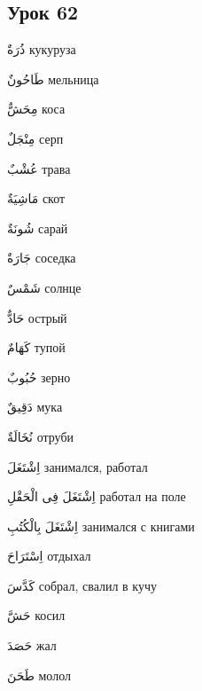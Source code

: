 \documentclass[a5paper]{article}
\newcommand\textstyleDropCaps[1]{#1}
\newcommand\textstyleCaptioncharacters[1]{#1}
\begin{document}
\subsection[Урок 62‎]{\textstyleDropCaps{Урок 62‎}}
\textstyleCaptioncharacters{ذُرَةٌ }\textstyleDropCaps{кукуруза‎}

\textstyleCaptioncharacters{طَاحُونٌ }\textstyleDropCaps{мельница‎}

\textstyleCaptioncharacters{مِحَشٌّ }\textstyleDropCaps{коса‎}

\textstyleCaptioncharacters{مِنْجَلٌ }\textstyleDropCaps{серп‎}

\textstyleCaptioncharacters{عُشْبٌ }\textstyleDropCaps{трава‎}

\textstyleCaptioncharacters{مَاشِيَةٌ }\textstyleDropCaps{скот‎}

\textstyleCaptioncharacters{شُونَةٌ }\textstyleDropCaps{сарай‎}

\textstyleCaptioncharacters{جَارَةٌ }\textstyleDropCaps{соседка‎}

\textstyleCaptioncharacters{شَمْسٌ }\textstyleDropCaps{солнце‎}

\textstyleCaptioncharacters{حَادٌّ }\textstyleDropCaps{острый‎}

\textstyleCaptioncharacters{كَهَامٌ }\textstyleDropCaps{тупой‎}

\textstyleCaptioncharacters{حُبُوبٌ }\textstyleDropCaps{зерно‎}

\textstyleCaptioncharacters{دَقِيقٌ }\textstyleDropCaps{мука‎}

\textstyleCaptioncharacters{نُخَالَةٌ }\textstyleDropCaps{отруби‎}

\textstyleCaptioncharacters{اِشْتَغَلَ }\textstyleDropCaps{занимался, рабо­тал‎}

\textstyleCaptioncharacters{اِشْتَغَلَ فِى الْحَقْلِ }\textstyleDropCaps{ра­ботал на поле‎}

\textstyleCaptioncharacters{اِشْتَغَلَ بِالْكُتُبِ }\textstyleDropCaps{зани­мался с книгами‎}

\textstyleCaptioncharacters{اِسْتَرَاحَ }\textstyleDropCaps{отдыхал‎}

\textstyleCaptioncharacters{كَدَّسَ }\textstyleDropCaps{собрал, свалил в кучу‎}

\textstyleCaptioncharacters{حَشَّ }\textstyleDropCaps{косил‎}

\textstyleCaptioncharacters{حَصَدَ }\textstyleDropCaps{жал‎}

\textstyleCaptioncharacters{طَحَنَ }\textstyleDropCaps{молол‎}
\end{document}
